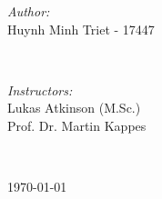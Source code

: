 \begin{titlepage}

\begin{minipage}{0.4\textwidth}
\begin{flushleft} \large
\emph{Author:}\\
Huynh Minh Triet - 17447\\

\end{flushleft}
\end{minipage}
~
\begin{minipage}{0.55\textwidth}
\begin{flushright} \large
\emph{Instructors:} \\
Lukas Atkinson (M.Sc.) \\
Prof. Dr. Martin Kappes 
\end{flushright}
\end{minipage}\\[2cm]
\makeatother


{\large \today}\\[2cm] %

\vfill %

\end{titlepage}
